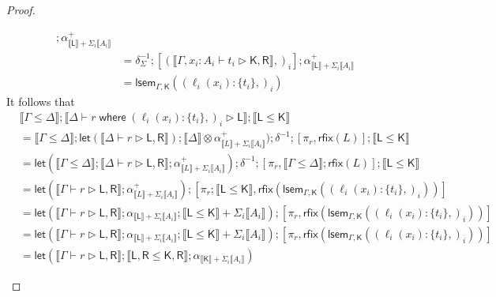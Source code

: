 \documentclass[acmsmall,screen,review]{acmart}
\newcommand{\ms}[1]{\ensuremath{\mathsf{#1}}}
\newcommand{\lto}{:}
\newcommand{\where}[2]{#1\;\ms{where}\;#2}
\newcommand{\wbranch}[3]{#1(#2) \lto \{#3\}}
\newcommand{\bhyp}[2]{#1 : #2}
\newcommand{\haslb}[3]{#1 \vdash #2 \rhd #3}
\newcommand{\dnt}[1]{\llbracket{#1}\rrbracket}
\newcommand{\loopmor}[3]{\ms{lsem}_{#1, #3}(#2)}
\newcommand{\lmor}[1]{\ms{let}(#1)}
\newcommand{\rfix}[1]{\ms{rfix}(#1)}
\begin{document}
\begin{proof}
\begin{itemize}
\begin{equation}
\begin{aligned}
          ; \alpha^+_{\dnt{\ms{L}} + \Sigma_i\dnt{A_i}} \\
        & = \delta^{-1}_{\Sigma}
          ; [(\dnt{\haslb{\Gamma, \bhyp{x_i}{A_i}}{t_i}{\ms{K}, \ms{R}}},)_i]
          ; \alpha^+_{\dnt{\ms{L}} + \Sigma_i\dnt{A_i}} \\
        & = \loopmor{\Gamma}{(\wbranch{\ell_i}{x_i}{t_i},)_i}{\ms{K}}
      \end{aligned}
    \end{equation}
    It follows that
    \begin{equation}
      \begin{aligned}
        & \dnt{\Gamma \leq \Delta} 
          ; \dnt{\haslb{\Delta}{\where{r}{(\wbranch{\ell_i}{x_i}{t_i},)_i}}{\ms{L}}}
          ; \dnt{\ms{L} \leq \ms{K}} \\
        & = \dnt{\Gamma \leq \Delta} 
          ; \lmor{\dnt{\haslb{\Delta}{r}{\ms{L}, \ms{R}}}}  
          ; \dnt{\Delta} \otimes \alpha^+_{\dnt{L} + \Sigma_i\dnt{A_i}})
          ; \delta^{-1}
          ; [\pi_r, \rfix{L}]
          ; \dnt{\ms{L} \leq \ms{K}} \\
        & = \lmor{\dnt{\Gamma \leq \Delta} 
            ; \dnt{\haslb{\Delta}{r}{\ms{L}, \ms{R}}}
            ; \alpha^+_{\dnt{L} + \Sigma_i\dnt{A_i}}}
          ; \delta^{-1}
          ; [\pi_r, \dnt{\Gamma \leq \Delta} ; \rfix{L}]
          ; \dnt{\ms{L} \leq \ms{K}} \\
        & = \lmor{\dnt{\haslb{\Gamma}{r}{\ms{L}, \ms{R}}}; \alpha^+_{\dnt{L} + \Sigma_i\dnt{A_i}}}
          ; [ \pi_r ; \dnt{\ms{L} \leq \ms{K}}, 
              \rfix{\loopmor{\Gamma}{(\wbranch{\ell_i}{x_i}{t_i},)_i}{\ms{K}}}
          ]
          \\
        & = \lmor{\dnt{\haslb{\Gamma}{r}{\ms{L}, \ms{R}}} 
            ; \alpha_{\dnt{\ms{L}} + \Sigma_i\dnt{A_i}}
            ; \dnt{\ms{L} \leq \ms{K}} + \Sigma_i\dnt{A_i}}
          ; [ \pi_r, 
              \rfix{\loopmor{\Gamma}{(\wbranch{\ell_i}{x_i}{t_i},)_i}{\ms{K}}}
          ]
          \\
        & = \lmor{\dnt{\haslb{\Gamma}{r}{\ms{L}, \ms{R}}} 
            ; \alpha_{\dnt{\ms{L}} + \Sigma_i\dnt{A_i}}
            ; \dnt{\ms{L} \leq \ms{K}} + \Sigma_i\dnt{A_i}}
          ; [ \pi_r, 
              \rfix{\loopmor{\Gamma}{(\wbranch{\ell_i}{x_i}{t_i},)_i}{\ms{K}}}
          ]
          \\
        & = \lmor{\dnt{\haslb{\Gamma}{r}{\ms{L}, \ms{R}}}
            ; \dnt{\ms{L}, \ms{R} \leq \ms{K}, \ms{R}} 
            ; \alpha_{\dnt{\ms{K}} + \Sigma_i\dnt{A_i}}}

\end{aligned}
\end{equation}
\end{itemize}
\end{proof}
\end{document}
